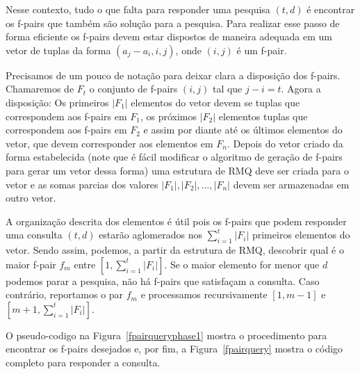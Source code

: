 \documentclass[12pt]{article}
\begin{document}
Nesse contexto, tudo o que falta para responder uma pesquisa $(t,d)$
é encontrar os f-pairs que também são solução para a pesquisa. 
Para realizar esse passo de forma eficiente os f-pairs devem
estar dispostos de maneira adequada em um vetor de tuplas da forma $(a_j - a_i, i, j)$,
onde $(i, j)$ é um f-pair.

Precisamos de um pouco de notação para deixar clara a disposição dos f-pairs.
Chamaremos de $F_t$ o conjunto de f-pairs $(i, j)$ tal que $j - i = t$. Agora 
a disposição: Os primeiros $|F_1|$ elementos do vetor devem se tuplas que correspondem aos f-pairs em $F_1$,
os próximos $|F_2|$ elementos tuplas que correspondem aos f-pairs em $F_2$ e assim por diante 
até os últimos elementos do vetor, que devem corresponder aos elementos em $F_n$.
Depois do vetor criado da forma estabelecida (note que é fácil modificar o 
algoritmo de geração de f-pairs para gerar um vetor dessa forma) uma estrutura de
RMQ deve ser criada para o vetor e as somas parcias dos valores $|F_1|, |F_2|, \ldots, |F_n|$
devem ser armazenadas em outro vetor. 

A organização descrita dos elementos é útil pois os f-pairs que podem responder uma consulta $(t,d)$ 
estarão aglomerados nos $\sum_{i = 1}^t |F_i|$ primeiros elementos do vetor. Sendo assim,
podemos, a partir da estrutura de RMQ, descobrir qual é o maior f-pair
$f_m$ entre $[1, \sum_{i = 1}^t |F_i|]$. Se o maior elemento for menor que $d$ podemos
parar a pesquisa, não há f-pairs que satisfaçam a consulta. Caso contrário, reportamos
o par $f_m$ e processamos recursivamente $[1, m - 1]$ e $[m + 1, \sum_{i=1}^t |F_i|]$.

O pseudo-codigo na Figura~\ref{fpairqueryphase1} mostra o procedimento para encontrar
os f-pairs desejados e, por fim, a Figura~\ref{fpairquery} mostra o código completo
para responder a consulta.
\end{document}
